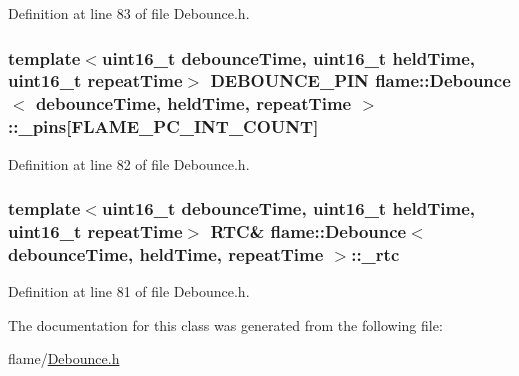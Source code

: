 Definition at line 83 of file Debounce.\-h.

\hypertarget{classflame_1_1_debounce_a8f167eb7572e66526be7824b79d334c3}{
\subsubsection[{\-\_\-pins}]{\setlength{\rightskip}{0pt plus 5cm}template$<$uint16\-\_\-t debounce\-Time, uint16\-\_\-t held\-Time, uint16\-\_\-t repeat\-Time$>$ {\bf D\-E\-B\-O\-U\-N\-C\-E\-\_\-\-P\-I\-N} {\bf flame\-::\-Debounce}$<$ debounce\-Time, held\-Time, repeat\-Time $>$\-::\-\_\-pins\mbox{[}{\bf F\-L\-A\-M\-E\-\_\-\-P\-C\-\_\-\-I\-N\-T\-\_\-\-C\-O\-U\-N\-T}\mbox{]}\hspace{0.3cm}{\ttfamily [protected]}}}\label{classflame_1_1_debounce_a8f167eb7572e66526be7824b79d334c3}


Definition at line 82 of file Debounce.\-h.

\hypertarget{classflame_1_1_debounce_abaed54518db29d8653452f167c6b6653}{
\subsubsection[{\-\_\-rtc}]{\setlength{\rightskip}{0pt plus 5cm}template$<$uint16\-\_\-t debounce\-Time, uint16\-\_\-t held\-Time, uint16\-\_\-t repeat\-Time$>$ {\bf R\-T\-C}\& {\bf flame\-::\-Debounce}$<$ debounce\-Time, held\-Time, repeat\-Time $>$\-::\-\_\-rtc\hspace{0.3cm}{\ttfamily [protected]}}}\label{classflame_1_1_debounce_abaed54518db29d8653452f167c6b6653}


Definition at line 81 of file Debounce.\-h.



The documentation for this class was generated from the following file\-:\begin{DoxyCompactItemize}
\item 
flame/\hyperlink{_debounce_8h}{Debounce.\-h}\end{DoxyCompactItemize}
